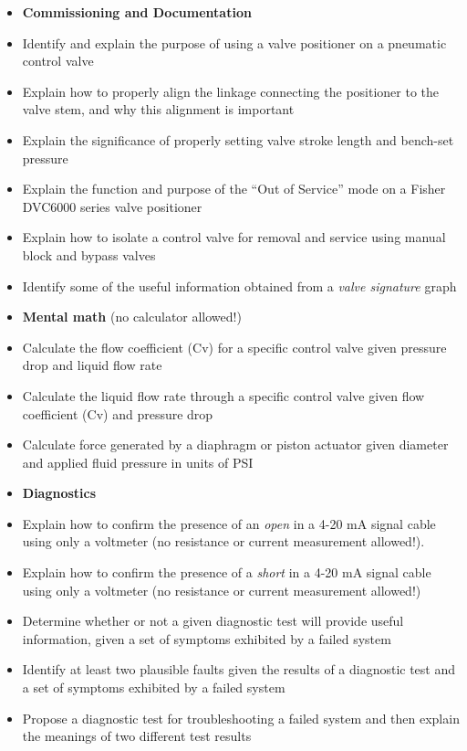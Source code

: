 \filbreak

\begin{itemize}
\item{} {\bf Commissioning and Documentation}
\item{} Identify and explain the purpose of using a valve positioner on a pneumatic control valve
\item{} Explain how to properly align the linkage connecting the positioner to the valve stem, and why this alignment is important
\item{} Explain the significance of properly setting valve stroke length and bench-set pressure
\item{} Explain the function and purpose of the ``Out of Service'' mode on a Fisher DVC6000 series valve positioner
\item{} Explain how to isolate a control valve for removal and service using manual block and bypass valves
\item{} Identify some of the useful information obtained from a {\it valve signature} graph
\end{itemize}

\filbreak

\begin{itemize}
\item{} {\bf Mental math} (no calculator allowed!)
\item{} Calculate the flow coefficient (Cv) for a specific control valve given pressure drop and liquid flow rate
\item{} Calculate the liquid flow rate through a specific control valve given flow coefficient (Cv) and pressure drop
\item{} Calculate force generated by a diaphragm or piston actuator given diameter and applied fluid pressure in units of PSI
\end{itemize}

\filbreak

\begin{itemize}
\item{} {\bf Diagnostics}
\item{} Explain how to confirm the presence of an {\it open} in a 4-20 mA signal cable using only a voltmeter (no resistance or current measurement allowed!).
\item{} Explain how to confirm the presence of a {\it short} in a 4-20 mA signal cable using only a voltmeter (no resistance or current measurement allowed!)  
\item{} Determine whether or not a given diagnostic test will provide useful information, given a set of symptoms exhibited by a failed system
\item{} Identify at least two plausible faults given the results of a diagnostic test and a set of symptoms exhibited by a failed system
\item{} Propose a diagnostic test for troubleshooting a failed system and then explain the meanings of two different test results
\end{itemize}



